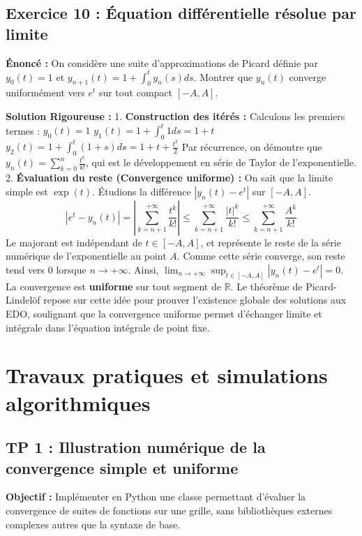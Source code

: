 \documentclass[11pt,a4paper]{article}
\begin{document}
\subsection*{Exercice 10 : Équation différentielle résolue par limite}
\textbf{Énoncé :}
On considère une suite d'approximations de Picard définie par $y_0(t) = 1$ et $y_{n+1}(t) = 1 + \int_0^t y_n(s) ds$.
Montrer que $y_n(t)$ converge uniformément vers $e^t$ sur tout compact $[-A, A]$.

\textbf{Solution Rigoureuse :}
1. \textbf{Construction des itérés :}
Calculons les premiers termes :
$y_0(t) = 1$
$y_1(t) = 1 + \int_0^t 1 ds = 1 + t$
$y_2(t) = 1 + \int_0^t (1+s) ds = 1 + t + \frac{t^2}{2}$
Par récurrence, on démontre que $y_n(t) = \sum_{k=0}^n \frac{t^k}{k!}$, qui est le développement en série de Taylor de l'exponentielle.
2. \textbf{Évaluation du reste (Convergence uniforme) :}
On sait que la limite simple est $\exp(t)$. Étudions la différence $|y_n(t) - e^t|$ sur $[-A, A]$.
$$|e^t - y_n(t)| = \left| \sum_{k=n+1}^{+\infty} \frac{t^k}{k!} \right| \le \sum_{k=n+1}^{+\infty} \frac{|t|^k}{k!} \le \sum_{k=n+1}^{+\infty} \frac{A^k}{k!}$$
Le majorant est indépendant de $t \in [-A, A]$, et représente le reste de la série numérique de l'exponentielle au point $A$.
Comme cette série converge, son reste tend vers $0$ lorsque $n \to +\infty$.
Ainsi, $\lim_{n \to +\infty} \sup_{t \in [-A, A]} |y_n(t) - e^t| = 0$.
La convergence est \textbf{uniforme} sur tout segment de $\mathbb{R}$.
Le théorème de Picard-Lindelöf repose sur cette idée pour prouver l'existence globale des solutions aux EDO, soulignant que la convergence uniforme permet d'échanger limite et intégrale dans l'équation intégrale de point fixe.




\section{Travaux pratiques et simulations algorithmiques}

\subsection*{TP 1 : Illustration numérique de la convergence simple et uniforme}
\textbf{Objectif :} Implémenter en Python une classe permettant d'évaluer la convergence de suites de fonctions sur une grille, sans bibliothèques externes complexes autres que la syntaxe de base.
\end{document}
